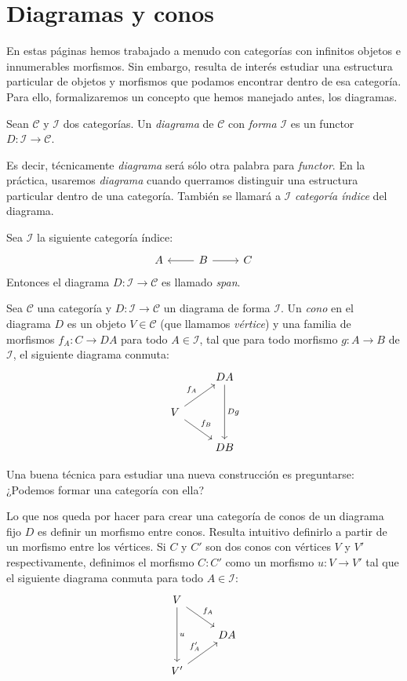 \documentclass[12pt, twoside]{book}
\newcommand{\cat}{{\mathcal{C}}}
\begin{document}
\section{Diagramas y conos}
En estas páginas hemos trabajado a menudo con categorías con infinitos objetos e innumerables morfismos.
Sin embargo, resulta de interés estudiar una estructura particular de objetos y morfismos que podamos encontrar dentro de esa categoría.
Para ello, formalizaremos un concepto que hemos manejado antes, los diagramas.
\begin{definition}
Sean $\cat$ y $\mathcal{I}$ dos categorías. Un \emph{diagrama} de $\cat$ con \emph{forma} $\mathcal{I}$ es un functor $D \colon \mathcal{I} \to \cat$.
\end{definition}
Es decir, técnicamente \emph{diagrama} será sólo otra palabra para \emph{functor}.
En la práctica, usaremos \emph{diagrama} cuando querramos distinguir una estructura particular dentro de una categoría.
También se llamará a $\mathcal{I}$ \emph{categoría índice} del diagrama.

\begin{example}\label{ejemplo-span}
Sea $\mathcal{I}$ la siguiente categoría índice:
\[ \begin{tikzcd}
A & B \arrow[l] \arrow[r] & C
\end{tikzcd} \]
Entonces el diagrama $D \colon \mathcal{I} \to \cat$ es llamado \emph{span}.
\end{example}

\begin{definition}
Sea $\cat$ una categoría y $D \colon \mathcal{I} \to \cat$ un diagrama de forma $\mathcal{I}$.
Un \emph{cono} en el diagrama $D$ es un objeto $V \in \cat$ (que llamamos \emph{vértice}) y una familia de morfismos $f_A \colon C \to D A$ para todo $A \in \mathcal{I}$, tal que para todo morfismo $g \colon A \to B$ de $\mathcal{I}$, el siguiente diagrama conmuta:
\[ \begin{tikzcd}
 & D A \arrow[dd,"D g"]\\
V \arrow[ur,"f_A"] \arrow[dr,"f_B"]\\
 & D B
\end{tikzcd} \]
\end{definition}

Una buena técnica para estudiar una nueva construcción es preguntarse: ¿Podemos formar una categoría con ella?

Lo que nos queda por hacer para crear una categoría de conos de un diagrama fijo $D$ es definir un morfismo entre conos.
Resulta intuitivo definirlo a partir de un morfismo entre los vértices.
Si $C$ y $C'$ son dos conos con vértices $V$ y $V'$ respectivamente, definimos el morfismo $C \colon C'$ como un morfismo $u \colon V \to V'$ tal que el siguiente diagrama conmuta para todo $A \in \mathcal{I}$:
\[ \begin{tikzcd}
V \arrow[dr,"f_A"] \arrow[dd,"u"] &\\
 & D A\\
V' \arrow[ur,"f'_A"]
\end{tikzcd} \]
\end{document}
